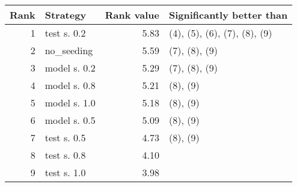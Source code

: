 \begin{tabular}{r l r l}
\textbf{Rank} & \textbf{Strategy} & \textbf{Rank value} & \textbf{Significantly better than} \\
\hline
1 & test s. 0.2		& 5.83 & (4), (5), (6), (7), (8), (9) \\
2 & no\_seeding		& 5.59 & (7), (8), (9) \\
3 & model s. 0.2	& 5.29 & (7), (8), (9) \\
4 & model s. 0.8	& 5.21 & (8), (9) \\
5 & model s. 1.0	& 5.18 & (8), (9) \\
6 & model s. 0.5	& 5.09 & (8), (9) \\
7 & test s. 0.5		& 4.73 & (8), (9) \\
8 & test s. 0.8		& 4.10 & \\
9 & test s. 1.0		& 3.98 & \\
\end{tabular}